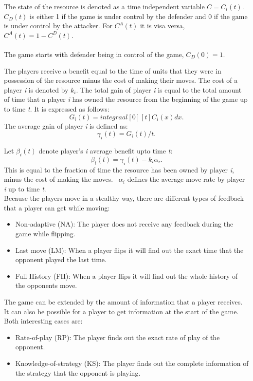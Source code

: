 The state of the resource is denoted as a time independent variable $C=C_{i}(t)$. 
$C_{D}(t)$ is either 1 if the game is under control by the defender and 0 if the game is under control by the attacker. For $C^{A}(t)$ it is visa versa, $C^{A}(t)= 1 - C^{D}(t)$.\\ \\
The game starts with defender being in control of the game, $C_{D}(0)= 1$. 

The players receive a benefit equal to the time of units that they were in possession of the resource minus the cost of making their moves. The cost of a player \textit{i} is denoted by $k_{i}$. 
The total gain of player \textit{i} is equal to the total amount of time that a player \textit{i} has owned the resource from the beginning of the game up to time \textit{t}. It is expressed as follows:
\begin{equation}\label{first}
G_{i}(t) = integraal [0][t] C_{i}(x) dx.
\end{equation}
The average gain of player \textit{i} is defined as:
\begin{equation}\label{first}
\gamma_{i}(t) = G_{i}(t)/t.
\end{equation}

Let $\beta_{i}(t)$ denote player's \textit{i} average benefit upto time \textit{t}:
\begin{equation}\label{first}
\beta_{i}(t) = \gamma_{i}(t) - k_{i}\alpha_{i}.
\end{equation}
This is equal to the fraction of time the resource has been owned by player \textit{i}, minus the cost of making the moves. ~$ \alpha_{i}$ defines the average move rate by player \textit{i} up to time \textit{t}.
\\

Because the players move in a stealthy way, there are different types of feedback that a player can get while moving:
\begin{itemize}
\item Non-adaptive (NA): The player does not receive any feedback during the game while flipping.
\item Last move (LM): When a player flips it will find out the exact time that the opponent played the last time.
\item Full History (FH): When a player flips it will find out the whole history of the opponents move.
\end{itemize}
The game can be extended by the amount of information that a player receives. It can also be possible for a player to get information at the start of the game. Both interesting cases are:
\begin{itemize}
\item Rate-of-play (RP): The player finds out the exact rate of play of the opponent.
\item Knowledge-of-strategy (KS): The player finds out the complete information of the strategy that the opponent is playing.
\end{itemize}

